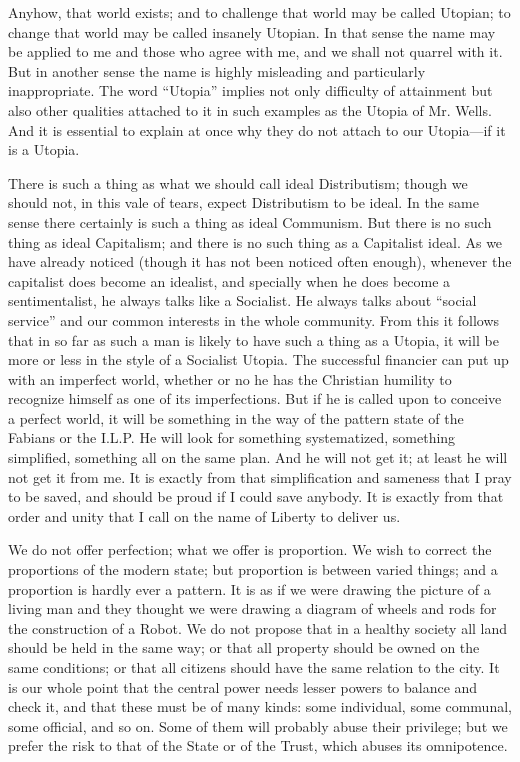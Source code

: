 \documentclass{book}
\begin{document}
Anyhow, that world exists; and to challenge that world may be called Utopian; to change that world may be called insanely Utopian. In that sense the name may be applied to me and those who agree with me, and we shall not quarrel with it. But in another sense the name is highly misleading and particularly inappropriate. The word “Utopia” implies not only difficulty of attainment but also other qualities attached to it in such examples as the Utopia of Mr. Wells. And it is essential to explain at once why they do not attach to our Utopia—if it is a Utopia.

There is such a thing as what we should call ideal Distributism; though we should not, in this vale of tears, expect Distributism to be ideal. In the same sense there certainly is such a thing as ideal Communism. But there is no such thing as ideal Capitalism; and there is no such thing as a Capitalist ideal. As we have already noticed (though it has not been noticed often enough), whenever the capitalist does become an idealist, and specially when he does become a sentimentalist, he always talks like a Socialist. He always talks about “social service” and our common interests in the whole community. From this it follows that in so far as such a man is likely to have such a thing as a Utopia, it will be more or less in the style of a Socialist Utopia. The successful financier can put up with an imperfect world, whether or no he has the Christian humility to recognize himself as one of its imperfections. But if he is called upon to conceive a perfect world, it will be something in the way of the pattern state of the Fabians or the I.L.P. He will look for something systematized, something simplified, something all on the same plan. And he will not get it; at least he will not get it from me. It is exactly from that simplification and sameness that I pray to be saved, and should be proud if I could save anybody. It is exactly from that order and unity that I call on the name of Liberty to deliver us.

We do not offer perfection; what we offer is proportion. We wish to correct the proportions of the modern state; but proportion is between varied things; and a proportion is hardly ever a pattern. It is as if we were drawing the picture of a living man and they thought we were drawing a diagram of wheels and rods for the construction of a Robot. We do not propose that in a healthy society all land should be held in the same way; or that all property should be owned on the same conditions; or that all citizens should have the same relation to the city. It is our whole point that the central power needs lesser powers to balance and check it, and that these must be of many kinds: some individual, some communal, some official, and so on. Some of them will probably abuse their privilege; but we prefer the risk to that of the State or of the Trust, which abuses its omnipotence.
\end{document}
